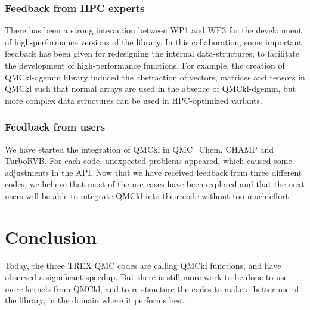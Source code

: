 \subsubsection{Feedback from HPC experts}

There has been a strong interaction between WP1 and WP3 for the
development of high-performance versions of the library. In this
collaboration, some important feedback has been given for redesigning
the internal data-structures, to facilitate the development of
high-performance functions. 
For example, the creation of QMCkl-dgemm library induced the
abstraction of vectors, matrices and tensors in QMCkl such that normal
arrays are used in the absence of QMCkl-dgemm, but more complex data
structures can be used in HPC-optimized variants.


\subsubsection{Feedback from users}

We have started the integration of QMCkl in QMC=Chem, CHAMP and
TurboRVB. For each code, unexpected problems appeared, which caused some
adjustments in the \ac{API}. Now that we have received feedback from three
different codes, we believe that most of the use cases have been
explored and that the next users will be able to integrate QMCkl into
their code without too much effort.

\section{Conclusion}

Today, the three TREX QMC codes are calling QMCkl functions, and have
observed a significant speedup. But there is still more work to be
done to use more kernels from QMCkl, and to re-structure the codes to
make a better use of the library, in the domain where it performs best.

